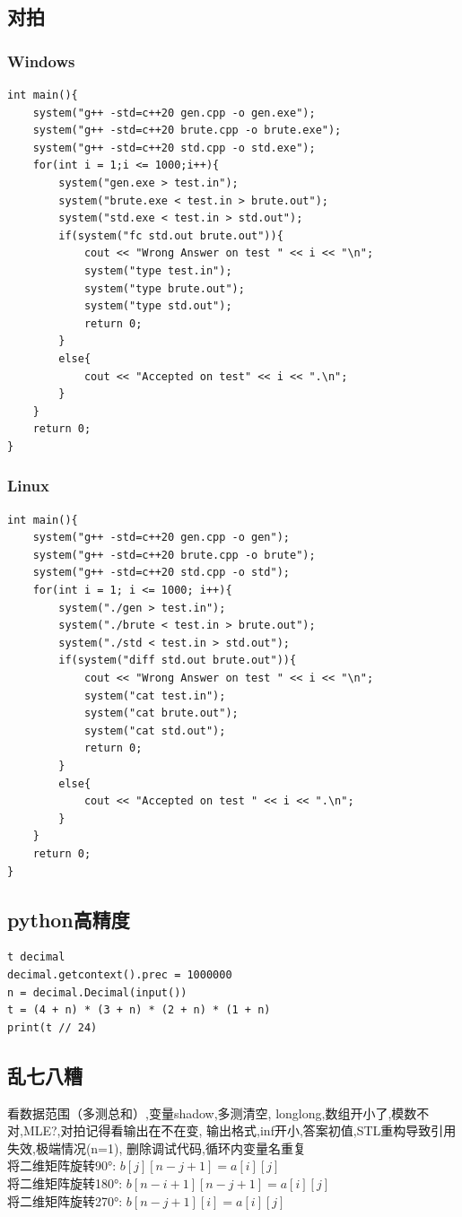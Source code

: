 \subsection{对拍}
\subsubsection{Windows}
\begin{lstlisting}[caption={}]
int main(){
	system("g++ -std=c++20 gen.cpp -o gen.exe");
	system("g++ -std=c++20 brute.cpp -o brute.exe");
	system("g++ -std=c++20 std.cpp -o std.exe");
	for(int i = 1;i <= 1000;i++){
		system("gen.exe > test.in");
		system("brute.exe < test.in > brute.out");
		system("std.exe < test.in > std.out");
		if(system("fc std.out brute.out")){
			cout << "Wrong Answer on test " << i << "\n";
			system("type test.in");
			system("type brute.out");
			system("type std.out");
			return 0;
		}
		else{
			cout << "Accepted on test" << i << ".\n";
		}
	}
	return 0;
}
\end{lstlisting}

\subsubsection{Linux}
\begin{lstlisting}[caption={}]
int main(){
    system("g++ -std=c++20 gen.cpp -o gen");
    system("g++ -std=c++20 brute.cpp -o brute");
    system("g++ -std=c++20 std.cpp -o std");
    for(int i = 1; i <= 1000; i++){
        system("./gen > test.in");
        system("./brute < test.in > brute.out");
        system("./std < test.in > std.out");
        if(system("diff std.out brute.out")){
            cout << "Wrong Answer on test " << i << "\n";
            system("cat test.in");
            system("cat brute.out");
            system("cat std.out");
            return 0;
        }
        else{
            cout << "Accepted on test " << i << ".\n";
        }
    }
    return 0;
}
\end{lstlisting}

\subsection{python高精度}
\begin{lstlisting}[caption={}]
t decimal
decimal.getcontext().prec = 1000000
n = decimal.Decimal(input())
t = (4 + n) * (3 + n) * (2 + n) * (1 + n)
print(t // 24)
\end{lstlisting}


\subsection{乱七八糟}
看数据范围（多测总和）,变量shadow,多测清空,
longlong,数组开小了,模数不对,MLE?,对拍记得看输出在不在变,
输出格式,inf开小,答案初值,STL重构导致引用失效,极端情况(n=1),
删除调试代码,循环内变量名重复\\

将二维矩阵旋转90°: $b[j][n - j + 1] = a[i][j]$\\
将二维矩阵旋转180°: $b[n - i + 1][n - j + 1] = a[i][j]$\\
将二维矩阵旋转270°: $b[n - j + 1][i] = a[i][j]$\\
